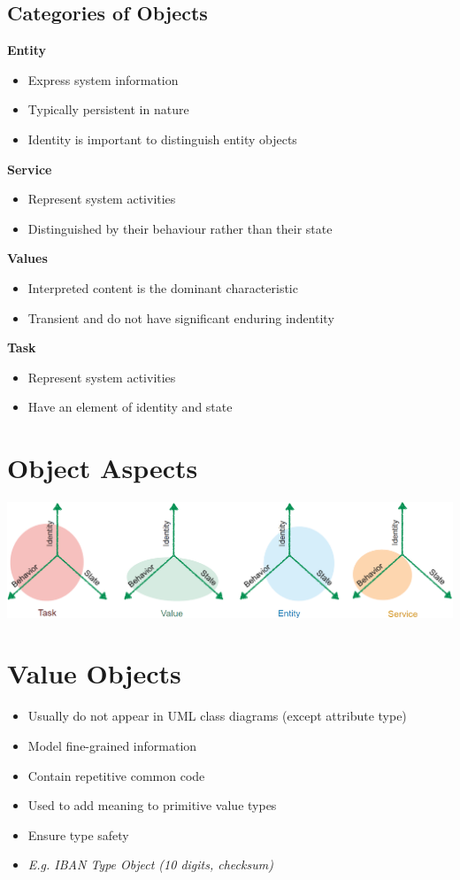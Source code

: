 \subsection{Categories of Objects}
\textbf{Entity}
\begin{itemize}
    \item Express system information
    \item Typically persistent in nature
    \item Identity is important to distinguish entity objects
\end{itemize}
\textbf{Service}
\begin{itemize}
    \item Represent system activities
    \item Distinguished by their behaviour rather than their state
\end{itemize}
\textbf{Values}
\begin{itemize}
    \item Interpreted content is the dominant characteristic
    \item Transient and do not have significant enduring indentity
\end{itemize}
\textbf{Task}
\begin{itemize}
    \item Represent system activities
    \item Have an element of identity and state
\end{itemize}

\section{Object Aspects}
\includegraphics[width=\linewidth]{./img/object_aspects.png}

\section{Value Objects}
\begin{itemize}
    \item Usually do not appear in UML class diagrams (except attribute type)
    \item Model fine-grained information
    \item Contain repetitive common code
    \item Used to add meaning to primitive value types
    \item Ensure type safety
    \item \textit{E.g. IBAN Type Object (10 digits, checksum)}
\end{itemize}

